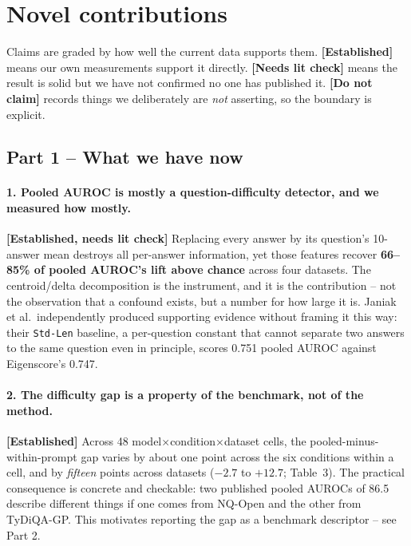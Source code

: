 \documentclass[11pt,a4paper]{article}
\begin{document}
\clearpage
\section*{Novel contributions}

Claims are graded by how well the current data supports them. \textbf{[Established]} means our own
measurements support it directly. \textbf{[Needs lit check]} means the result is solid but we have
not confirmed no one has published it. \textbf{[Do not claim]} records things we deliberately are
\emph{not} asserting, so the boundary is explicit.

\subsection*{Part 1 -- What we have now}

\paragraph{1. Pooled AUROC is mostly a question-difficulty detector, and we measured how mostly.}
\textbf{[Established, needs lit check]} Replacing every answer by its question's 10-answer mean
destroys all per-answer information, yet those features recover \textbf{66--85\% of pooled AUROC's
lift above chance} across four datasets. The centroid/delta decomposition is the instrument, and
it is the contribution -- not the observation that a confound exists, but a number for how large
it is. Janiak et al.\ independently produced supporting evidence without framing it this way:
their \texttt{Std-Len} baseline, a per-question constant that cannot separate two answers to the
same question even in principle, scores 0.751 pooled AUROC against Eigenscore's 0.747.

\paragraph{2. The difficulty gap is a property of the benchmark, not of the method.}
\textbf{[Established]} Across 48 model$\times$condition$\times$dataset cells, the pooled-minus-
within-prompt gap varies by about one point across the six conditions within a cell, and by
\emph{fifteen} points across datasets ($-2.7$ to $+12.7$; Table~3). The practical consequence is
concrete and checkable: two published pooled AUROCs of 86.5 describe different things if one comes
from NQ-Open and the other from TyDiQA-GP. This motivates reporting the gap as a benchmark
descriptor -- see Part 2.
\end{document}
